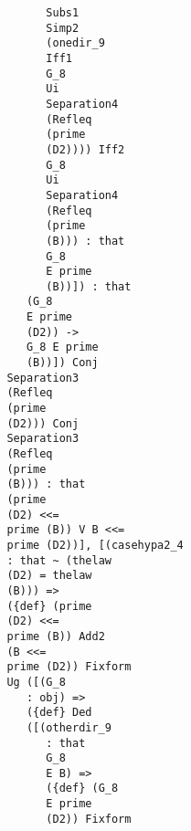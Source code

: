 \documentclass[12pt]{article}
\begin{document}
\begin{verbatim}
                                        Subs1 
                                        Simp2 
                                        (onedir_9 
                                        Iff1 
                                        G_8 
                                        Ui 
                                        Separation4 
                                        (Refleq 
                                        (prime 
                                        (D2)))) Iff2 
                                        G_8 
                                        Ui 
                                        Separation4 
                                        (Refleq 
                                        (prime 
                                        (B))) : that 
                                        G_8 
                                        E prime 
                                        (B))]) : that 
                                     (G_8 
                                     E prime 
                                     (D2)) -> 
                                     G_8 E prime 
                                     (B))]) Conj 
                                  Separation3 
                                  (Refleq 
                                  (prime 
                                  (D2))) Conj 
                                  Separation3 
                                  (Refleq 
                                  (prime 
                                  (B))) : that 
                                  (prime 
                                  (D2) <<= 
                                  prime (B)) V B <<= 
                                  prime (D2))], [(casehypa2_4 
                                  : that ~ (thelaw 
                                  (D2) = thelaw 
                                  (B))) => 
                                  ({def} (prime 
                                  (D2) <<= 
                                  prime (B)) Add2 
                                  (B <<= 
                                  prime (D2)) Fixform 
                                  Ug ([(G_8 
                                     : obj) => 
                                     ({def} Ded 
                                     ([(otherdir_9 
                                        : that 
                                        G_8 
                                        E B) => 
                                        ({def} (G_8 
                                        E prime 
                                        (D2)) Fixform 

\end{verbatim}
\end{document}
